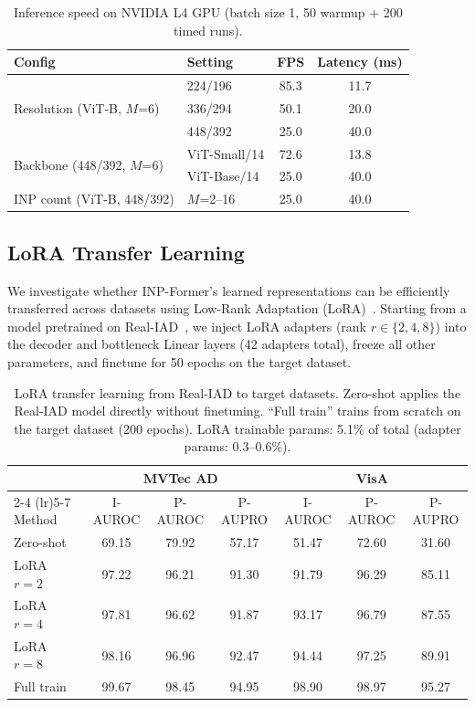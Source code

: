 \documentclass[10pt]{article} %
\begin{document}
\begin{table}[t]
\caption{Inference speed on NVIDIA L4 GPU (batch size 1, 50 warmup + 200 timed runs).}
\label{tab:inference}
\begin{center}
\begin{tabular}{llcc}
\toprule
Config & Setting & FPS & Latency (ms) \\
\midrule
\multirow{3}{*}{Resolution (ViT-B, $M$=6)} & 224/196 & 85.3 & 11.7 \\
 & 336/294 & 50.1 & 20.0 \\
 & 448/392 & 25.0 & 40.0 \\
\midrule
\multirow{2}{*}{Backbone (448/392, $M$=6)} & ViT-Small/14 & 72.6 & 13.8 \\
 & ViT-Base/14 & 25.0 & 40.0 \\
\midrule
INP count (ViT-B, 448/392) & $M$=2--16 & 25.0 & 40.0 \\
\bottomrule
\end{tabular}
\end{center}
\end{table}


\subsection{LoRA Transfer Learning}
\label{sec:lora}

We investigate whether INP-Former's learned representations can be efficiently transferred across datasets using Low-Rank Adaptation (LoRA)~\citep{hu2022lora}. Starting from a model pretrained on Real-IAD~\citep{realiad2024}, we inject LoRA adapters (rank $r \in \{2, 4, 8\}$) into the decoder and bottleneck Linear layers (42 adapters total), freeze all other parameters, and finetune for 50 epochs on the target dataset.

\begin{table}[t]
\caption{LoRA transfer learning from Real-IAD to target datasets. Zero-shot applies the Real-IAD model directly without finetuning. ``Full train'' trains from scratch on the target dataset (200 epochs). LoRA trainable params: 5.1\% of total (adapter params: 0.3--0.6\%).}
\label{tab:lora}
\begin{center}
\begin{tabular}{lcccccc}
\toprule
 & \multicolumn{3}{c}{MVTec AD} & \multicolumn{3}{c}{VisA} \\
\cmidrule(lr){2-4} \cmidrule(lr){5-7}
Method & I-AUROC & P-AUROC & P-AUPRO & I-AUROC & P-AUROC & P-AUPRO \\
\midrule
Zero-shot         & 69.15 & 79.92 & 57.17 & 51.47 & 72.60 & 31.60 \\
LoRA $r=2$ & 97.22 & 96.21 & 91.30 & 91.79 & 96.29 & 85.11 \\
LoRA $r=4$ & 97.81 & 96.62 & 91.87 & 93.17 & 96.79 & 87.55 \\
LoRA $r=8$ & 98.16 & 96.96 & 92.47 & 94.44 & 97.25 & 89.91 \\
\midrule
Full train & 99.67 & 98.45 & 94.95 & 98.90 & 98.97 & 95.27 \\
\bottomrule
\end{tabular}
\end{center}
\end{table}
\end{document}
